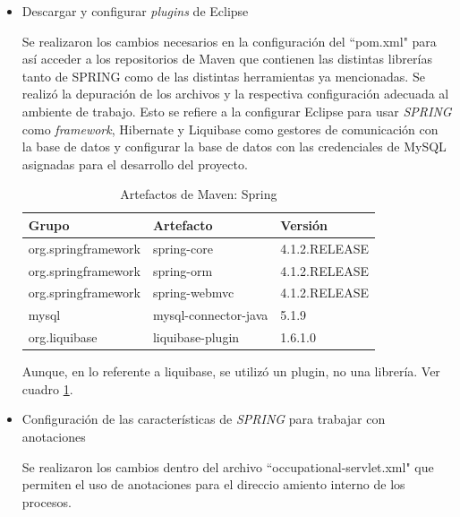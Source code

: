 \begin{enumerate}
\begin{itemize}
           \item Descargar y configurar \textit{plugins} de Eclipse
           
           Se realizaron los cambios necesarios en la configuración del ``pom.xml" para así acceder a los repositorios de Maven que contienen las distintas librerías tanto de SPRING como de las distintas herramientas ya mencionadas. Se realizó la depuración de los archivos y la respectiva configuración adecuada al ambiente de trabajo. Esto se refiere a la configurar Eclipse para usar \textit{SPRING} como \textit{framework}, Hibernate y Liquibase como gestores de comunicación con la base de datos y configurar la base de datos con las credenciales de MySQL asignadas para el desarrollo del proyecto.
           
           \begin{table}[h!]
               
               \begin{center}
                   \begin{tabular}{|l|l|l|}\hline
                       Grupo & Artefacto & Versión \\\hline
                       org.springframework & spring-core & 4.1.2.RELEASE \\\hline
                       org.springframework & spring-orm & 4.1.2.RELEASE \\\hline
                       org.springframework & spring-webmvc & 4.1.2.RELEASE \\\hline
                       mysql & mysql-connector-java & 5.1.9 \\\hline
                       org.liquibase & liquibase-plugin & 1.6.1.0 \\\hline
                    \end{tabular}
                \end{center}
                
                \caption{Artefactos de Maven: Spring}
                \label{artefactos-spring}
           \end{table}
            
           Aunque, en lo referente a liquibase, se utilizó un plugin, no una librería. Ver cuadro \ref{artefactos-spring}.
           
           \item Configuración de las características de \textit{SPRING} para trabajar con anotaciones
           
           Se realizaron los cambios dentro del archivo ``occupational-servlet.xml" que permiten el uso de anotaciones para el direccio amiento interno de los procesos.
           

\end{itemize}
\end{enumerate}
